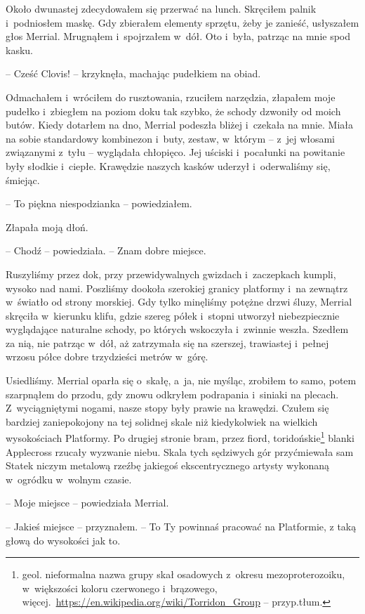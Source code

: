 \documentclass[oneside,polish,11pt,sfheadings]{mwbk}
\begin{document}
Około dwunastej zdecydowałem się przerwać na lunch. Skręciłem palnik i~podniosłem maskę. Gdy zbierałem elementy sprzętu, żeby je zanieść,
usłyszałem głos Merrial. Mrugnąłem i~spojrzałem w~dół. Oto i~była,
patrząc na mnie spod kasku.

-- Cześć Clovis! -- krzyknęła, machając pudełkiem na obiad.

Odmachałem i~wróciłem do rusztowania, rzuciłem narzędzia, złapałem moje
pudełko i~zbiegłem na poziom doku tak szybko, że schody dzwoniły od
moich butów. Kiedy dotarłem na dno, Merrial podeszła bliżej i~czekała na
mnie. Miała na sobie standardowy kombinezon i~buty, zestaw, w~którym -- z~jej włosami związanymi z~tyłu -- wyglądała chłopięco. Jej uściski i~pocałunki na powitanie były słodkie i~ciepłe. Krawędzie naszych kasków
uderzył i~oderwaliśmy się, śmiejąc.

-- To piękna niespodzianka -- powiedziałem.

Złapała moją dłoń. 

-- Chodź -- powiedziała. -- Znam dobre miejsce.

Ruszyliśmy przez dok, przy przewidywalnych gwizdach i~zaczepkach kumpli,
wysoko nad nami. Poszliśmy dookoła szerokiej granicy platformy i~na
zewnątrz w~światło od strony morskiej. Gdy tylko minęliśmy potężne drzwi
śluzy, Merrial skręciła w~kierunku klifu, gdzie szereg półek i~stopni
utworzył niebezpiecznie wyglądające naturalne schody, po których
wskoczyła i~zwinnie weszła. Szedłem za nią, nie patrząc w~dół, aż
zatrzymała się na szerszej, trawiastej i~pełnej wrzosu półce dobre
trzydzieści metrów w~górę.

Usiedliśmy. Merrial oparła się o~skałę, a~ja, nie myśląc, zrobiłem to
samo, potem szarpnąłem do przodu, gdy znowu odkryłem podrapania i~siniaki na plecach. Z~wyciągniętymi nogami, nasze stopy były prawie na
krawędzi. Czułem się bardziej zaniepokojony na tej solidnej skale niż
kiedykolwiek na wielkich wysokościach Platformy. Po drugiej stronie
bram, przez fiord, toridońskie\footnote{geol. nieformalna nazwa grupy skał
osadowych z~okresu mezoproterozoiku, w~większości koloru czerwonego i~brązowego,
więcej.~\url{https://en.wikipedia.org/wiki/Torridon\_Group} -- przyp.tłum.} blanki Applecross rzucały wyzwanie niebu. Skala tych
sędziwych gór przyćmiewała sam Statek niczym metalową rzeźbę jakiegoś
ekscentrycznego artysty wykonaną w~ogródku w~wolnym czasie.

-- Moje miejsce -- powiedziała Merrial.

-- Jakieś miejsce -- przyznałem. -- To Ty powinnaś pracować na Platformie,
z taką głową do wysokości jak to.
\end{document}

